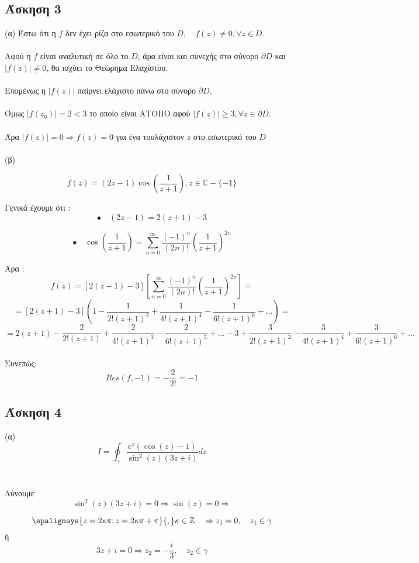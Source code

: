 \documentclass[12pt]{article}
\begin{document}
 \newpage
 \subsection{Άσκηση 3}
(α)
Έστω ότι η $f$ δεν έχει ρίζα  στο εσωτερικό του $ D ,\quad f(z)\neq 0, \forall z \in D$.
\\ \\
Αφού η $f$ είναι αναλυτική σε όλο το $D$, άρα είναι και συνεχής στο σύνορο $\partial D$ και $|f(z)|\neq0$, θα ισχύει το Θεώρημα Ελαχίστου.
\\ \\
Επομένως η $|f(z)|$ παίρνει ελάχιστο πάνω στο σύνορο $\partial D$.
\\ \\
Όμως $|f(z_0)|=2<3$ το οποίο είναι ΑΤΟΠΟ αφού $ |f(z)|\geq 3,\forall z \in \partial D$. 
\\ \\
 Άρα $|f(z)|=0\Rightarrow f(z)= 0$ για ένα τουλάχιστον $z$ στο εσωτερικό του $D$
\\ \\
(β)

$$ f(z)= (2z-1)\cos{\left(\frac{1}{z+1}\right)} , z \in \mathbb{C}- \{ -1 \} $$


Γενικά έχουμε ότι :
$$\bullet \quad (2z-1)=2(z+1)-3$$
 
$$\bullet \quad \cos{\left(\frac{1}{z+1}\right)} =\sum_{n=0}^\infty \frac{(-1)^n}{(2n)!}\left(\frac{1}{z+1}\right)^{2n} $$ 

Άρα : 
$$ f(z)=[2(z+1)-3]\left[ \sum_{n=0}^\infty \frac{(-1)^n}{(2n)!}\left(\frac{1}{z+1}\right)^{2n} \right]= $$
$$= [2(z+1)-3] \left( 1-\frac{1}{2!(z+1)^2}+\frac{1}{4!(z+1)^4}-\frac{1}{6!(z+1)^6}+...  \right)=  $$
$$=  2(z+1)-\frac{2}{2!(z+1)}+\frac{2}{4!(z+1)^3}-\frac{2}{6!(z+1)^5}+...-3+  \frac{3}{2!(z+1)^2}-\frac{3}{4!(z+1)^4}+\frac{3}{6!(z+1)^6}+... $$
\\
Συνεπώς:
$$ Res(f,-1)=-\frac{2}{2!}=-1 $$

\newpage
 \subsection{Άσκηση 4}
(α)
$$ Ι=\oint_{\gamma} \frac{ e^z(\cos(z)-1)}{\sin^2(z)(3z+i)}dz $$
\\ \\
Λύνουμε 
$$\sin^2(z)(3z+i)=0 \Rightarrow \sin(z)=0 \Rightarrow $$

\[
\spalignsys{z=2\kappa \pi ; z=2 \kappa \pi +\pi}{,}\kappa\in\mathbb{Z}
\quad \Rightarrow z_1=0,\quad z_1\in\gamma
\]
ή 
$$3z+i=0\Rightarrow z_2=-\frac{i}{3},\quad z_2\in\gamma$$
\end{document}

